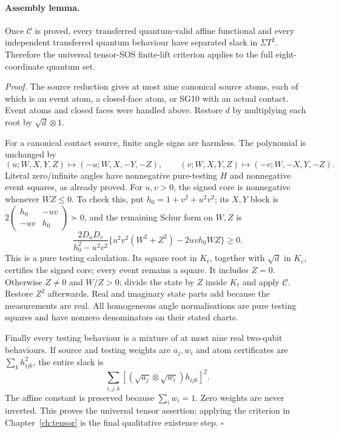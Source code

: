 \paragraph{Assembly lemma.}
Once $\mathcal C$ is proved, every transferred quantum-valid affine
functional and every independent transferred quantum behaviour
have separated slack in $\Sigma T^2$.  Therefore the universal
tensor-SOS finite-lift criterion applies to the full eight-coordinate
quantum set.

\emph{Proof.}
The source reduction gives at most nine canonical source atoms,
each of which is an event atom, a closed-face atom, or SG10 with
an actual contact.  Event atoms and closed faces were handled above.
Restore $d$ by multiplying each root by $\sqrt d\otimes1$.

For a canonical contact source, finite angle signs are harmless.
The polynomial is unchanged by
\[
 (u;W,X,Y,Z)\mapsto(-u;W,X,-Y,-Z),\qquad
 (v;W,X,Y,Z)\mapsto(-v;W,-X,Y,-Z).
\]
Literal zero/infinite angles have nonnegative pure-testing $H$ and
nonnegative event squares, as already proved.  For $u,v>0$, the
signed core is nonnegative whenever $WZ\leq0$.  To check this,
put $h_0=1+v^2+u^2v^2$; its $X,Y$ block is
$2\left(\begin{smallmatrix}h_0&-uv\\-uv&h_0\end{smallmatrix}\right)
\succ0$, and the remaining Schur form on $W,Z$ is
\[
 \frac{2D_uD_v}{h_0^2-u^2v^2}
 \{u^2v^2(W^2+Z^2)-2uvh_0WZ\}\geq0.                 \tag{SG15}
\]
This is a pure testing calculation.  Its square root in $K_t$,
together with $\sqrt d$ in $K_c$, certifies the signed core;
every event remains a square.  It includes $Z=0$.
Otherwise $Z\ne0$ and $W/Z>0$; divide the state by $Z$ inside
$K_t$ and apply $\mathcal C$.  Restore $Z^2$ afterwards.
Real and imaginary state parts add because the measurements are
real.  All homogeneous angle normalisations are pure testing
squares and have nonzero denominators on their stated charts.

Finally every testing behaviour is a mixture of at most nine real
two-qubit behaviours.  If source and testing weights are $a_j,w_i$
and atom certificates are $\sum_kh_{ijk}^2$, the entire slack is
\[
       \sum_{i,j,k}
           [ (\sqrt{a_j}\otimes\sqrt{w_i})h_{ijk}]^2.
\]
The affine constant is preserved because $\sum_iw_i=1$.
Zero weights are never inverted.  This proves the universal tensor
assertion; applying the criterion in Chapter~\ref{ch:tensor} is the final
qualitative existence step. \hfill$\square$

